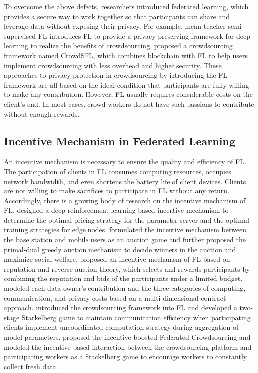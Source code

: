 \documentclass[final,1p,times]{elsarticle}
\begin{document}
To overcome the above defects, researchers introduced federated learning, which provides a secure way to work together so that participants can share and leverage data without exposing their privacy. For example, mean teacher semi-supervised FL \citep{zhang2021toward} introduces FL to provide a privacy-preserving framework for deep learning to realize the benefits of crowdsourcing. \cite{li2020crowdsf} proposed a crowdsourcing framework named CrowdSFL, which combines blockchain with FL to help users implement crowdsourcing with less overhead and higher security. These approaches to privacy protection in crowdsourcing by introducing the FL framework are all based on the ideal condition that participants are fully willing to make any contribution. However, FL usually requires considerable costs on the client's end. In most cases, crowd workers do not have such passions to contribute without enough rewards.

\subsection{Incentive Mechanism in Federated Learning}
An incentive mechanism is necessary to ensure the quality and efficiency of FL. The participation of clients in FL consumes computing resources, occupies network bandwidth, and even shortens the battery life of client devices. Clients are not willing to make sacrifices to participate in FL without any return. Accordingly, there is a growing body of research on the incentive mechanism of FL. \cite{zhan2020learn} designed a deep reinforcement learning-based incentive mechanism to determine the optimal pricing strategy for the parameter server and the optimal training strategies for edge nodes. \cite{le2021incentive} formulated the incentive mechanism between the base station and mobile users as an auction game and further proposed the primal-dual greedy auction mechanism to decide winners in the auction and maximize social welfare. \cite{zhang2021incentive} proposed an incentive mechanism of FL based on reputation and reverse auction theory, which selects and rewards participants by combining the reputation and bids of the participants under a limited budget.  \cite{9317806} modeled each data owner's contribution and the three categories of computing, communication, and privacy costs based on a multi-dimensional contract approach. \cite{pandey2019incentivize} introduced the crowdsourcing framework into FL and developed a two-stage Starkelberg game to maintain communication efficiency when participating clients implement uncoordinated computation strategy during aggregation of model parameters. \cite{kang2022incentive} proposed the incentive-boosted Federated Crowdsourcing and modeled the incentive-based interaction between the crowdsourcing platform and participating workers as a Stackelberg game to encourage workers to constantly collect fresh data.
\end{document}
